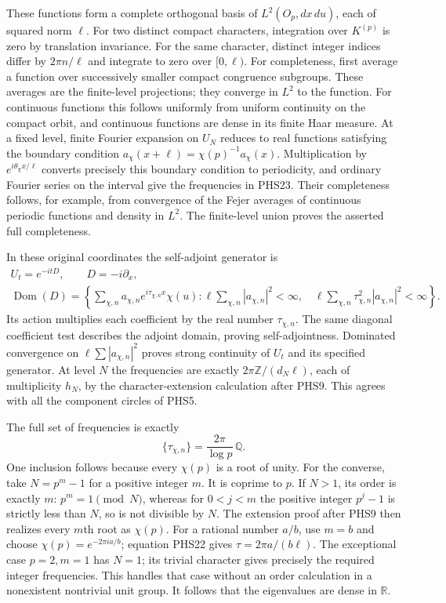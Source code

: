 These functions form a complete orthogonal basis of
$L^2(O_p,dx\,du)$, each of squared norm $\ell$.
For two distinct compact characters, integration over $K^{(p)}$
is zero by translation invariance. For the same character, distinct
integer indices differ by $2\pi n/\ell$ and integrate to zero
over $[0,\ell)$. For completeness, first average a function over
successively smaller compact congruence subgroups. These averages
are the finite-level projections; they converge in $L^2$ to the
function. For continuous functions this follows uniformly from
uniform continuity on the compact orbit, and continuous functions
are dense in its finite Haar measure. At a fixed level, finite
Fourier expansion on $U_N$ reduces to real functions satisfying
the boundary condition
$a_\chi(x+\ell)=\chi(p)^{-1}a_\chi(x)$.
Multiplication by $e^{i\theta_\chi x/\ell}$ converts precisely
this boundary condition to periodicity, and ordinary Fourier
series on the interval give the frequencies in PHS23. Their
completeness follows, for example, from convergence of the Fejer
averages of continuous periodic functions and density in $L^2$.
The finite-level union proves the asserted full completeness.

In these original coordinates the self-adjoint generator is
\begin{equation}\tag{PHS24}\begin{gathered}
 U_t=e^{-itD},\qquad D=-i\partial_x,\\
 \operatorname{Dom}(D)=
 \left\{\sum_{\chi,n}a_{\chi,n}e^{i\tau_{\chi,n}x}\chi(u):
       \ell\sum_{\chi,n}|a_{\chi,n}|^2<\infty,
       \quad\ell\sum_{\chi,n}\tau_{\chi,n}^2|a_{\chi,n}|^2<\infty
       \right\}.
\end{gathered}
\end{equation}
Its action multiplies each coefficient by the real number
$\tau_{\chi,n}$. The same diagonal coefficient test describes
the adjoint domain, proving self-adjointness. Dominated convergence
on $\ell\sum|a_{\chi,n}|^2$ proves strong continuity of $U_t$
and its specified generator. At level $N$ the frequencies are
exactly $2\pi\mathbb Z/(d_N\ell)$, each of multiplicity $h_N$,
by the character-extension calculation after PHS9. This agrees
with all the component circles of PHS5.

The full set of frequencies is exactly
\begin{equation}\tag{PHS25}
 \{\tau_{\chi,n}\}=\frac{2\pi}{\log p}\,\mathbb Q.
\end{equation}
One inclusion follows because every $\chi(p)$ is a root of unity.
For the converse, take $N=p^m-1$ for a positive integer $m$.
It is coprime to $p$. If $N>1$, its order is exactly $m$:
$p^m=1\pmod N$, whereas for $0<j<m$ the positive integer
$p^j-1$ is strictly less than $N$, so is not divisible by $N$.
The extension proof after PHS9 then realizes every $m$th root
as $\chi(p)$. For a rational number $a/b$, use $m=b$ and
choose $\chi(p)=e^{-2\pi ia/b}$; equation PHS22 gives
$\tau=2\pi a/(b\ell)$.
The exceptional case $p=2,m=1$ has $N=1$; its trivial character
gives precisely the required integer frequencies. This handles
that case without an order calculation in a nonexistent nontrivial
unit group. It follows that the eigenvalues are dense in
$\mathbb R$.

